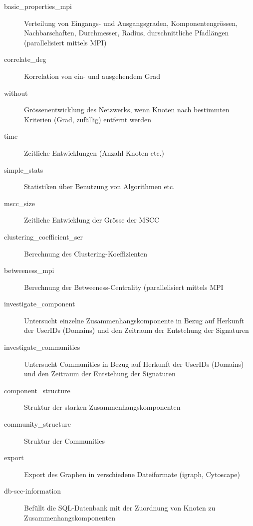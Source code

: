\begin{appendix}
\begin{description}
\item[basic\_properties\_mpi] Verteilung von Eingangs- und
  Ausgangsgraden, Komponentengrössen, Nachbarschaften, Durchmesser,
  Radius, durschnittliche Pfadlängen (parallelisiert mittels MPI)
\item[correlate\_deg] Korrelation von ein- und ausgehendem Grad
\item[without] Gr\"ossenentwicklung des Netzwerks, wenn Knoten nach
  bestimmten Kriterien (Grad, zuf\"allig) entfernt werden
\item[time] Zeitliche Entwicklungen (Anzahl Knoten etc.)
\item[simple\_stats] Statistiken \"uber Benutzung von Algorithmen etc.
\item[mscc\_size] Zeitliche Entwicklung der Gr\"osse der MSCC
\item[clustering\_coefficient\_ser] Berechnung des
  Clustering-Koeffizienten
\item[betweeness\_mpi] Berechnung der Betweeness-Centrality
  (parallelisiert mittels MPI
\item[investigate\_component] Untersucht einzelne
  Zusammenhangskomponente in Bezug auf Herkunft der UserIDs
  (Domains) und den Zeitraum der Entstehung der Signaturen 
\item[investigate\_communities] Untersucht Communities in Bezug auf
  Herkunft der UserIDs (Domains) und den Zeitraum der Entstehung der
  Signaturen
\item[component\_structure] Struktur der starken
  Zusammenhangskomponenten
\item[community\_structure] Struktur der Communities
\item[export] Export des Graphen in verschiedene Dateiformate (igraph,
  Cytoscape)
\item[db-scc-information] Befüllt die SQL-Datenbank mit der
  Zuordnung von Knoten zu Zusammenhangskomponenten
\end{description}
\end{appendix}
